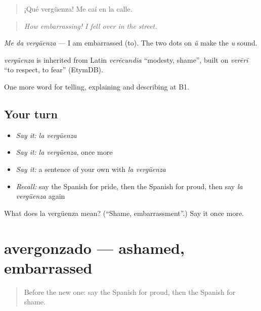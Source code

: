 \begin{quote}
¡Qué vergüenza! Me caí en la calle.
\end{quote}

\begin{quote}
\emph{How embarrassing! I fell over in the street.}
\end{quote}

\emph{Me da vergüenza} — I am embarrassed (to). The two dots on \emph{ü} make the \emph{u} sound.

\begin{cousinweb}
\emph{vergüenza} is inherited from Latin \emph{verēcundia} \textquotedblleft{}modesty, shame\textquotedblright{}, built on \emph{verērī} \textquotedblleft{}to respect, to fear\textquotedblright{} (EtymDB).
\end{cousinweb}

\begin{grammarlens}[title={What you've built}]
One more word for telling, explaining and describing at B1.
\end{grammarlens}

\subsection*{Your turn}
\begin{itemize}
\raggedright
  \item \emph{Say it:} \emph{la vergüenza}
  \item \emph{Say it:} \emph{la vergüenza}, once more
  \item \emph{Say it:} a sentence of your own with \emph{la vergüenza}
  \item \emph{Recall:} say the Spanish for pride, then the Spanish for proud, then say \emph{la vergüenza} again
\end{itemize}

\begin{tcolorbox}[breakable,colback=teal!4,colframe=teal!35!black,title={Before you move on}]
What does la vergüenza mean? (\textquotedblleft{}Shame, embarrassment\textquotedblright{}.) Say it once more.
\end{tcolorbox}
\section[avergonzado]{avergonzado — ashamed, embarrassed}

\label{lesson:ES-C705-avergonzado}



\begin{quote}
Before the new one: say the Spanish for proud, then the Spanish for shame.
\end{quote}

